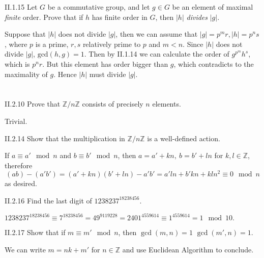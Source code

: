 \begin{problem}{II.1.15}
Let $G$ be a commutative group, and let $g\in G$ be an element of maximal \emph{finite} order. Prove that if $h$ has finite order in $G$, then $|h|$ \emph{divides} $|g|$.
\end{problem}
\begin{pf}
Suppose that $|h|$ does not divide $|g|$, then we can assume that $|g| = p^mr, |h| = p^ns$, where $p$ is a prime, $r, s$ relatively prime to $p$ and $m<n$. Since $|h|$ does not divide $|g|$, $\text{gcd}(h,g) = 1$. Then by II.1.14 we can calculate the order of $g^{p^m}h^s$, which is $p^nr$. But this element has order bigger than $g$, which contradicts to the maximality of $g$. Hence $|h|$ must divide $|g|$.
\end{pf}

\section{}

\begin{problem}{II.2.10}
Prove that $\mathbb{Z}/n\mathbb{Z}$ consists of precisely $n$ elements.
\end{problem}
\begin{pf}
Trivial.
\end{pf}

\begin{problem}{II.2.14}
Show that the multiplication in $\mathbb{Z}/n\mathbb{Z}$ is a well-defined action.
\end{problem}
\begin{pf}
If $a \equiv a' \mod n$ and $b \equiv b' \mod n$, then $a = a' + kn, \: b = b' + ln$ for $k, l \in \mathbb{Z}$, therefore
\[
(ab) - (a'b') = (a' + kn)(b' + ln) - a'b' = a'ln + b'kn + kln^2 \equiv 0 \mod n
\]
as desired.
\end{pf}

\begin{problem}{II.2.16}
Find the last digit of $1238237^{18238456}$.
\end{problem}
\begin{sol}
$
1238237^{18238456} \equiv 7^{18238456} = 49^{9119228} = 2401^{4559614} \equiv 1^{4559614} = 1 \mod 10.
$
\end{sol}

\begin{problem}{II.2.17}
Show that if $m \equiv m' \mod n$, then $\gcd(m, n) = 1$ \iffw $\gcd(m', n) = 1$.
\end{problem}
\begin{pf}
We can write $m = nk + m'$ for $n \in \mathbb{Z}$ and use Euclidean Algorithm to conclude.
\end{pf}


